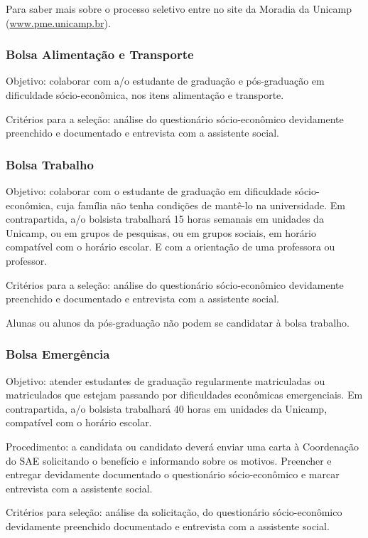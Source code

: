 Para saber mais sobre o processo seletivo entre no site da Moradia da Unicamp
(\url{www.pme.unicamp.br}).

\subsubsection{Bolsa Alimentação e Transporte}

Objetivo: colaborar com a/o estudante de graduação e pós-graduação em
dificuldade só\-cio-\-e\-co\-nô\-mi\-ca, nos itens alimentação e transporte.

Critérios para a seleção: análise do questionário só\-cio-\-e\-co\-nô\-mi\-co
devidamente preenchido e documentado e entrevista com a assistente social.

\subsubsection{Bolsa Trabalho}

Objetivo: colaborar com o estudante de graduação em dificuldade
sócio-econômica, cuja família não tenha condições de mantê-lo na universidade.
Em contrapartida, a/o bolsista trabalhará 15 horas semanais em unidades da
Unicamp, ou em grupos de pesquisas, ou em grupos sociais, em horário compatível
com o horário escolar. E com a orientação de uma professora ou professor.

Critérios para a seleção: análise do questionário sócio-econômico devidamente
preenchido e documentado e entrevista com a assistente social.

Alunas ou alunos da pós-graduação não podem se candidatar à bolsa trabalho.

\subsubsection{Bolsa Emergência}

Objetivo: atender estudantes de graduação regularmente matriculadas ou
matriculados que estejam passando por dificuldades econômicas emergenciais. Em
contrapartida, a/o bolsista trabalhará 40 horas em unidades da Unicamp,
compatível com o horário escolar.

Procedimento: a candidata ou candidato deverá enviar uma carta à Coordenação do
SAE solicitando o benefício e informando sobre os motivos. Preencher e entregar
devidamente documentado o questionário sócio-econômico e marcar entrevista com
a assistente social.

Critérios para seleção: análise da solicitação, do questionário sócio-econômico
devidamente preenchido documentado e entrevista com a assistente social.

